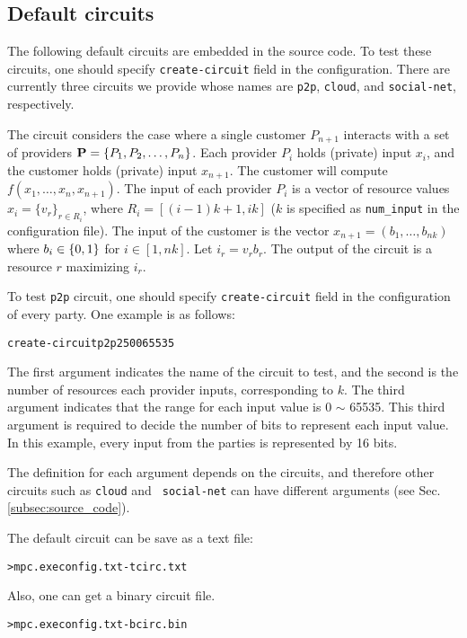 \documentclass{article}
\begin{document}
\subsection{Default circuits}\label{subsec:default_circuits}
The following default circuits are embedded in the source code.
To test these circuits, one should specify {\tt create-circuit} field in
the configuration. There are currently three circuits we provide whose names
are {\tt p2p}, {\tt cloud}, and {\tt social-net}, respectively.

The circuit considers the case where a single customer $P_{n+1}$
interacts with a set of providers $\P = \{P_1, P_2, \ldots, P_n\}$.
Each provider $P_i$ holds (private) input $x_i$, and the customer
holds (private) input $x_{n+1}$.  The customer will compute $f(x_1,
\ldots, x_n, x_{n+1})$.
%
The input of each provider $P_i$ is a vector of resource values $x_i =
\{v_r\}_{r \in R_i}$, where $R_i = [(i-1)k+1, ik]$ ($k$ is specified
as {\tt num\_input} in the configuration file).
%
The input of the customer is the vector  $ x_{n+1} = (b_1, \ldots,
b_{nk})$ where $b_i \in \zo$ for $i \in [1,nk]$.
%
Let $i_r = v_r b_r$. The output of the circuit is a resource $r$
maximizing $i_r$.

To test {\tt p2p} circuit, one should specify {\tt create-circuit} field in
the configuration of every party. One example is as follows:
\begin{alltt}
create-circuit p2p 2500 65535
\end{alltt}
The first argument indicates the name of the circuit to test, and the
second is the number of resources each provider inputs, corresponding to $k$.
The third argument indicates that the range for each input value is 0 $\sim$ 65535.
This third argument is required to decide the number of bits to represent
each input value. In this example, every input from the parties is represented
by 16 bits.

The definition for each argument depends on the circuits, and
therefore other circuits such as {\tt cloud} and {\tt
social-net} can have different arguments (see Sec.
\ref{subsec:source_code}).

The default circuit can be save as a text file:
\begin{alltt}
>mpc.exe config.txt -t circ.txt
\end{alltt}
Also, one can get a binary circuit file.
\begin{alltt}
>mpc.exe config.txt -b circ.bin
\end{alltt}
\end{document}
